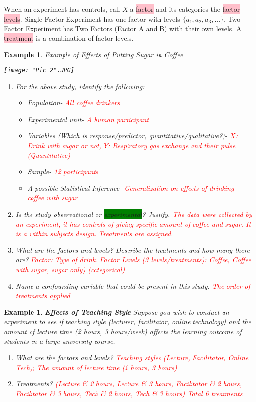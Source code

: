 \documentclass[a4paper,11pt]{article}
\newtheorem{eg}[thm]{Example}
\begin{document}
When an experiment has controls, call $X$ a \colorbox{pink}{factor} and its categories the \colorbox{pink}{factor levels}. Single-Factor Experiment has one factor with levels $\{a_1, a_2, a_3,...\}$. Two-Factor Experiment has Two Factors (Factor A and B) with their own levels. A \colorbox{pink}{treatment} is a combination of factor levels. 
\newpage
\begin{eg}
\normalfont
Example of Effects of Putting Sugar in Coffee

	\texttt{[image: "Pic 2".JPG]}

\begin{enumerate}
\item For the above study, identify the following: 
\begin{itemize}
\item Population- \textcolor{red}{All coffee drinkers}
\item Experimental unit- \textcolor{red}{A human participant}
\item Variables (Which is response/predictor, quantitative/qualitative?)- \textcolor{red}{$X$: Drink with sugar or not, $Y$: Respiratory gas exchange and their pulse (Quantitative)}
\item Sample- \textcolor{red}{12 participants}
\item A possible Statistical Inference- \textcolor{red}{Generalization on effects of drinking coffee with sugar}
\end{itemize}
\item Is the study observational or \colorbox{green}{experimental}? Justify. \textcolor{red}{The data were collected by an experiment, it has controls of giving specific amount of coffee and sugar. It is a within subjects design. Treatments are assigned.}
\item What are the factors and levels? Describe the treatments and how many there are? \textcolor{red}{Factor: Type of drink. Factor Levels (3 levels/treatments): Coffee, Coffee with sugar, sugar only) (categorical)}
\item Name a confounding variable that could be present in this study. \textcolor{red}{The order of treatments applied}
\end{enumerate}
\end{eg}

\begin{eg}
\normalfont
\textbf{Effects of Teaching Style}
Suppose you wish to conduct an experiment to see if teaching style (lecturer, facilitator, online technology) and the amount of lecture time (2 hours, 3 hours/week) affects the learning outcome of students in a large university course. 

\begin{enumerate}
\item What are the factors and levels? \textcolor{red}{Teaching styles (Lecture, Facilitator, Online Tech); The amount of lecture time (2 hours, 3 hours)}
\item Treatments? \textcolor{red}{(Lecture \& 2 hours, Lecture \& 3 hours, Facilitator \& 2 hours, Facilitator \& 3 hours, Tech \& 2 hours, Tech \& 3 hours) Total 6 treatments}
\end{enumerate}
\end{eg}
\end{document}
